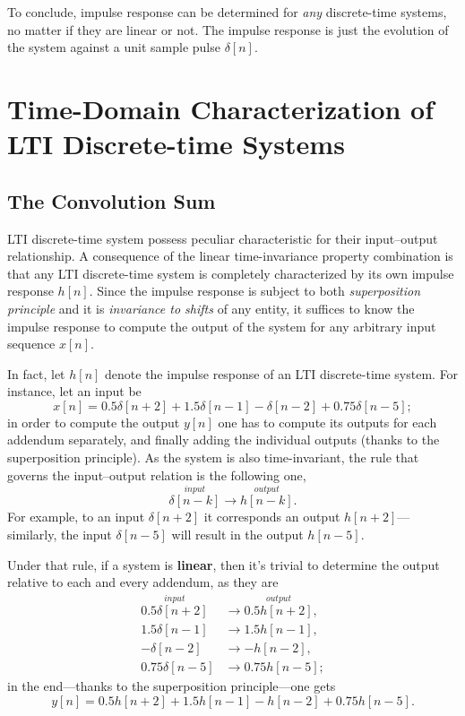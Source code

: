 \documentclass[\documentfontsize, twocolumn]{\classname}
\begin{document}
To conclude, impulse response can be determined for \emph{any} discrete-time systems, no matter if they are linear or not. The impulse response is just the evolution of the system against a unit sample pulse $\delta[n]$.

\section{Time-Domain Characterization of LTI Discrete-time Systems}

\subsection{The Convolution Sum}

LTI discrete-time system possess peculiar characteristic for their input--output relationship. A consequence of the linear time-invariance property combination is that any LTI discrete-time system is completely characterized by its own impulse response $h[n]$. Since the impulse response is subject to both \emph{superposition principle} and it is \emph{invariance to shifts} of any entity, it suffices to know the impulse response to compute the output of the system for any arbitrary input sequence $x[n]$.

In fact, let $h[n]$ denote the impulse response of an LTI discrete-time system. For instance, let an input be
\[
    x[n] = 0.5\delta[n+2] + 1.5\delta[n-1] - \delta[n-2] + 0.75\delta[n-5];
\]
in order to compute the output $y[n]$ one has to compute its outputs for each addendum separately, and finally adding the individual outputs (thanks to the superposition principle). As the system is also time-invariant, the rule that governs the input--output relation is the following one,
\begin{equation}\label{eqn:impulseResponseLTI}
    \overset{input}{\delta[n-k]} \longrightarrow \overset{output}{h[n-k]}.
\end{equation}
For example, to an input $\delta[n+2]$ it corresponds an output $h[n+2]$---similarly, the input $\delta[n-5]$ will result in the output $h[n-5]$.

Under that rule, if a system is \textbf{linear}, then it's trivial to determine the output relative to each and every addendum, as they are
\begin{align*}
    \overset{input}{0.5\delta[n+2]} & \longrightarrow \overset{output}{0.5h[n+2]},\\
    1.5\delta[n-1] & \longrightarrow 1.5h[n-1],\\
    -\delta[n-2] & \longrightarrow -h[n-2],\\
    0.75\delta[n-5] & \longrightarrow 0.75h[n-5];
\end{align*}
in the end---thanks to the superposition principle---one gets
\[
    y[n] = 0.5h[n+2] + 1.5h[n-1] - h[n-2] + 0.75h[n-5].
\]
\end{document}
